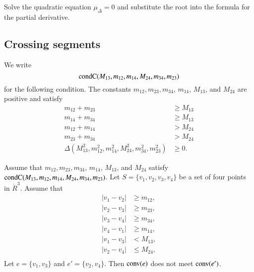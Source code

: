 \begin{tarskidata}
\begin{tarski}
\begin{proved} Solve the quadratic equation  $\mu_\Delta=0$ and substitute the root
into the formula for the partial derivative.
\swallowed\end{proved}
\end{tarski}









\begin{tarski}
\section{Crossing segments}

\begin{definition}[$\op{condC}$]
We write
	$$
	{\operatorname{condC}}(M_{13},m_{12},m_{14},M_{24},m_{34},m_{23})
	$$
for the following condition.
The constants  $m_{12},m_{23},m_{34}$,  $m_{14}$, 
$M_{13}$, and $M_{24}$ are positive and satisfy
	$$
	\begin{array}{rll}
	m_{12} + m_{23} &\ge M_{13}\\
	m_{14} + m_{34} &\ge M_{13}\\
	m_{12} + m_{14} &> M_{24}\\
	m_{23} + m_{34} &> M_{24}\\
	\Delta(M^2_{13},m^2_{12},m^2_{14},M^2_{24},
		m^2_{34},m^2_{23}) &\ge 0.
	\end{array}
	$$
\end{definition}
\end{tarski}



\begin{tarski}

\begin{lemma} 
Assume that  $m_{12},m_{23},m_{34}$,  $m_{14}$, 
$M_{13}$, and $M_{24}$ satisfy 
  ${\operatorname{condC}}(M_{13},m_{12},m_{14},M_{24},m_{34},m_{23})$.
Let $S=\{v_1,v_2,v_3,v_4\}$ be a set of four points in $\ring{R}^3$.
Assume that
	$$
	\begin{array}{lll}
	|v_1-v_2|&\ge m_{12},\\
	|v_2-v_3|&\ge m_{23},\\
	|v_3-v_4|&\ge m_{34},\\
	|v_4-v_1|&\ge m_{14},\\
	|v_1-v_3|&< M_{13},\\
	|v_2-v_4|&\le M_{24},\\
	\end{array}
	$$  
Let $e = \{v_1,v_3\}$ and $e'=\{v_2,v_4\}$.
Then ${\operatorname{conv}} (e)$ does not meet ${\operatorname{conv}} (e')$.    	
\end{lemma}


\end{tarski}
\end{tarskidata}
